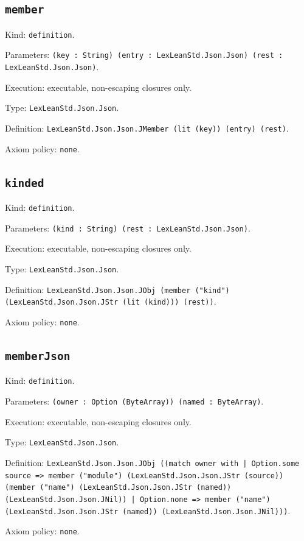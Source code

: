 \documentclass[11pt]{article}
\begin{document}
\subsection*{\texttt{member}}
\noindent Kind: \texttt{definition}.\par
\noindent Parameters: \texttt{(key : String) (entry : LexLeanStd.Json.Json) (rest : LexLeanStd.Json.Json)}.\par
\noindent Execution: executable, non-escaping closures only.\par
\noindent Type: \texttt{LexLeanStd.Json.Json}.\par
\noindent Definition: \texttt{LexLeanStd.Json.Json.JMember (lit (key)) (entry) (rest)}.\par
\noindent Axiom policy: \texttt{none}.\par
\subsection*{\texttt{kinded}}
\noindent Kind: \texttt{definition}.\par
\noindent Parameters: \texttt{(kind : String) (rest : LexLeanStd.Json.Json)}.\par
\noindent Execution: executable, non-escaping closures only.\par
\noindent Type: \texttt{LexLeanStd.Json.Json}.\par
\noindent Definition: \texttt{LexLeanStd.Json.Json.JObj (member ("kind") (LexLeanStd.Json.Json.JStr (lit (kind))) (rest))}.\par
\noindent Axiom policy: \texttt{none}.\par
\subsection*{\texttt{memberJson}}
\noindent Kind: \texttt{definition}.\par
\noindent Parameters: \texttt{(owner : Option (ByteArray)) (named : ByteArray)}.\par
\noindent Execution: executable, non-escaping closures only.\par
\noindent Type: \texttt{LexLeanStd.Json.Json}.\par
\noindent Definition: \texttt{LexLeanStd.Json.Json.JObj ((match owner with | Option.some source => member ("module") (LexLeanStd.Json.Json.JStr (source)) (member ("name") (LexLeanStd.Json.Json.JStr (named)) (LexLeanStd.Json.Json.JNil)) | Option.none => member ("name") (LexLeanStd.Json.Json.JStr (named)) (LexLeanStd.Json.Json.JNil)))}.\par
\noindent Axiom policy: \texttt{none}.\par
\end{document}

